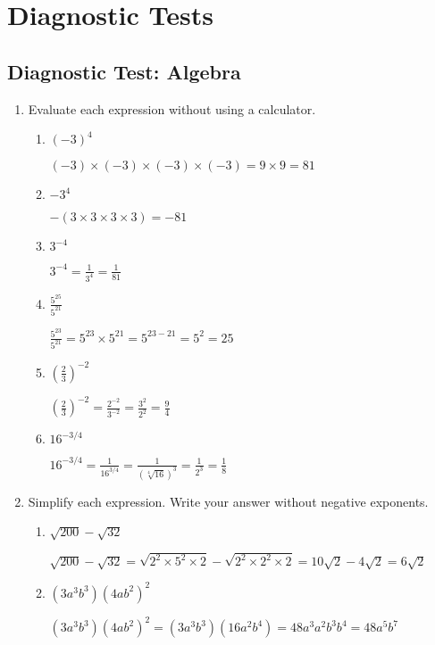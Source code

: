 \documentclass{article}
\begin{document}
\section{Diagnostic Tests}
\subsection{Diagnostic Test: Algebra}

\begin{enumerate}
	\item Evaluate each expression without using a calculator.
	\begin{enumerate}
		\item $(-3)^4$
		
		$ (-3)\times(-3)\times(-3)\times(-3) = 9\times9 = 81 $
		
		\item $-3^4$
		
		$ -(3\times3\times3\times3) = -81 $
		
		\item $3^{-4}$
		
		$ 3^{-4} = \frac{1}{3^4} = \frac{1}{81} $
		
		\item $\frac{5^{25}}{5^{21}}$
		
		$\frac{5^{23}}{5^{21}} 
		 = 5^{23}\times5^{21} 
		 = 5^{23-21}
		 = 5^2 
		 = 25$
		 
		 \item $(\frac{2}{3})^{-2}$
		 
		 $(\frac{2}{3})^{-2} = \frac{2^{-2}}{3^{-2}} = \frac{3^2}{2^2} = \frac{9}{4}$
		 
		 \item $16^{-3/4}$
		 
		 $16^{-3/4} = \frac{1}{16^{3/4}} = \frac{1}{(\sqrt[4]{16})^3} = \frac{1}{2^3} = \frac{1}{8}$
		 
	\end{enumerate}
	\item Simplify each expression. Write your answer without negative exponents.
	\begin{enumerate}
		\item $\sqrt{200} - \sqrt{32}$
		
		$\sqrt{200} - \sqrt{32} =  \sqrt{2^2\times5^2\times2} - \sqrt{2^2\times2^2\times2} = 10\sqrt{2} - 4\sqrt{2} = 6\sqrt{2}$
		
		\item $(3{a}^{3}b^{3})(4ab^{2})^{2}$
		
		$(3{a}^{3}b^{3})(4ab^{2})^{2} = (3{a}^{3}b^{3})(16a^2b^4) = 48a^3a^2b^3b^4 = 48a^5b^7$
		

\end{enumerate}
\end{enumerate}
\end{document}
